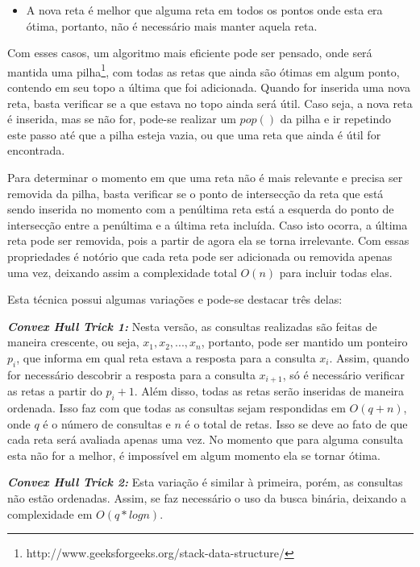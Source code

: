 \begin{itemize}[leftmargin=-.001in]
\begin{itemize}
\item A nova reta é melhor que alguma reta em todos os pontos onde esta era ótima, portanto, não é necessário mais manter aquela reta.
\end{itemize}

Com esses casos, um algoritmo mais eficiente pode ser pensado, onde será mantida uma pilha\footnote{http://www.geeksforgeeks.org/stack-data-structure/}, com todas as retas que ainda são ótimas em algum ponto, contendo em seu topo a última que foi adicionada. Quando for inserida uma nova reta, basta verificar se a que estava no topo ainda será útil. Caso seja, a nova reta é inserida, mas se não for, pode-se realizar um $pop()$ da pilha e ir repetindo este passo até que a pilha esteja vazia, ou que uma reta que ainda é útil for encontrada.

Para determinar o momento em que uma reta não é mais relevante e precisa ser removida da pilha, basta verificar se o ponto de intersecção da reta que está sendo inserida no momento com a penúltima reta está a esquerda do ponto de intersecção entre a penúltima e a última reta incluída. Caso isto ocorra, a última reta pode ser removida, pois a partir de agora ela se torna irrelevante. Com essas propriedades é notório que cada reta pode ser adicionada ou removida apenas uma vez, deixando assim a complexidade total $O(n)$ para incluir todas elas.

Esta técnica possui algumas variações e pode-se destacar três delas:

\textit{\textbf{Convex Hull Trick 1:}}  Nesta versão, as consultas realizadas são feitas de maneira crescente, ou seja, $x_{1}, x_{2}, ..., x_{n}$, portanto, pode ser mantido um ponteiro $p_{i}$, que informa em qual reta estava a resposta para a consulta $x_{i}$. Assim, quando for necessário descobrir a resposta para a consulta $x_{i+1}$, só é necessário verificar as retas a partir do $p_{i} + 1$. Além disso, todas as retas serão inseridas de maneira ordenada. Isso faz com que todas as consultas sejam respondidas em $O(q + n)$, onde $q$ é o número de consultas e $n$ é o total de retas. Isso se deve ao fato de que cada reta será avaliada apenas uma vez. No momento que para alguma consulta esta não for a melhor, é impossível em algum momento ela se tornar ótima.

\textit{\textbf{Convex Hull Trick 2:}} Esta variação é similar à primeira, porém, as consultas não estão ordenadas. Assim, se faz necessário o uso da busca binária, deixando a complexidade em $O(q*log n)$.


\end{itemize}
